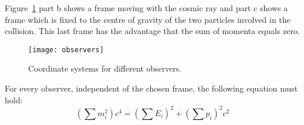 Figure~\ref{fig:observers} part b shows a frame moving with the cosmic ray and part c shows a frame which is fixed to the centre of gravity of the two particles involved in the collision. This last frame has the advantage that the sum of momenta equals zero.

\begin{figure}\begin{center}
\texttt{[image: observers]}%
\caption{Coordinate systems for different observers.}\label{fig:observers}
\end{center}\end{figure}

For every observer, independent of the chosen frame, the following equation must hold:
\begin{equation}
\left(  \sum m_i^2 \right)  c^4 = \left(  \sum E_i \right)^2 + \left(  \sum p_i \right)^2 c^2 \label{eq:frame_indep}
\end{equation}

